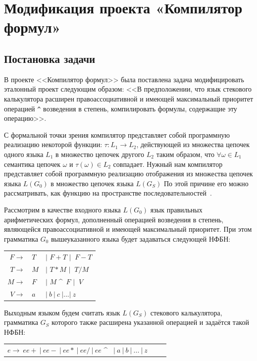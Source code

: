 \section{Модификация проекта «Компилятор формул»}
\subsection*{Постановка задачи}
В проекте <<Компилятор формул>> была поставлена задача модифицировать эталонный проект следующим образом: <<В предположении, что язык стекового калькулятора расширен правоассоциативной и имеющей максимальный приоритет операцией \verb|^| возведения в степень, компилировать формулы, содержащие эту операцию>>.


С формальной точки зрения компилятор представляет собой программную реализацию некоторой функции: $\tau\colon L_1 \rightarrow L_2$,  действующей из множества цепочек одного языка $L_1$ в множество цепочек другого $L_2$ таким образом, что $\forall \omega \in L_1$  семантика цепочек $\omega$  и $\tau(\omega) \in L_2$  совпадает.
Нужный нам компилятор представляет собой программную реализацию отображения из множества цепочек языка $L(G_0)$  в множество цепочек языка $L(G_S)$ По этой причине его можно рассматривать, как функцию на пространстве последовательностей~\cite{stack}.

Рассмотрим в качестве входного языка $L(G_0)$ язык правильных арифметических формул, дополненный операцией  возведения в степень, являющейся правоассоциативной и имеющей максимальный приоритет. При этом грамматика $G_0$ вышеуказанного языка будет задаваться следующей НФБН:
\\

\begin{center}
\begin{tabular}{rll}
    $F  \rightarrow$ & $T$  &  $|$ $F+T$ $|$ $ \ F-T $\\
    $T  \rightarrow$ & $M$  &  $|$ $T*M$ $|$ $ \  T/M $\\
    $M  \rightarrow$ & $F$  &  $|$ $M$ \^~$F $   $|$ $ \ V $\\
    $V  \rightarrow$ & $a$  &  $| \ b  \ | \  c \  |  ...  |  \  z $\\ 
\end{tabular} 
\end{center}
Выходным языком будем считать язык $L(G_S)$ стекового калькулятора, грамматика $G_S$ которого также расширена указанной операцией  и задаётся такой НФБН:

\begin{center}
\begin{tabular}{rll}
     $e  \rightarrow \ e e + \ | \ e e - \ | \ e e * \ | \ e e / \ | \ e e$ \^~ $| \ a \ | \ b \ | \ ... \ | \ z \ $ \\
\end{tabular} 
\end{center}
